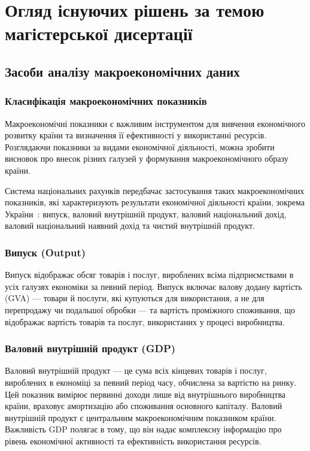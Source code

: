 \section{Огляд існуючих рішень за темою магістерської дисертації}

\subsection{Засоби аналізу макроекономічних даних}

\subsubsection{Класифікація макроекономічних показників}

Макроекономічні показники є важливим інструментом для вивчення економічного розвитку країни та визначення її ефективності у використанні ресурсів. Розглядаючи показники за видами економічної діяльності, можна зробити висновок про внесок різних галузей у формування макроекономічного образу країни. 

Система національних рахунків передбачає застосування таких макроекономічних показників, які характеризують результати економічної діяльності країни, зокрема України~\cite{Malyi2016}: випуск, валовий внутрішній продукт, валовий національний дохід, валовий національний наявний дохід та чистий внутрішній продукт.

\subsubsection*{Випуск (Output)}

Випуск відображає обсяг товарів і послуг, вироблених всіма підприємствами в усіх галузях економіки за певний період. Випуск включає валову додану вартість (GVA) --- товари й послуги, які купуються для використання, а не для перепродажу чи подальшої обробки --- та вартість проміжного споживання, що відображає вартість товарів та послуг, використаних у процесі виробництва.

\subsubsection*{Валовий внутрішній продукт (GDP)}

Валовий внутрішній продукт --- це сума всіх кінцевих товарів і послуг, вироблених в економіці за певний період часу, обчислена за вартістю на ринку. Цей показник вимірює первинні доходи лише від внутрішнього виробництва країни, враховує амортизацію або споживання основного капіталу. Валовий внутрішній продукт є центральним макроекономічним показником країни. Важливість GDP полягає в тому, що він надає комплексну інформацію про рівень економічної активності та ефективність використання ресурсів.

